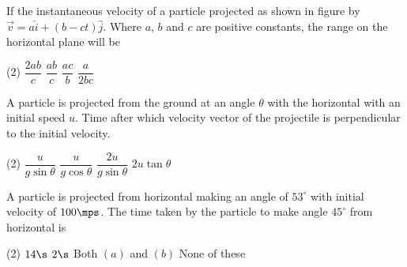 \item If the instantaneous velocity of a particle projected as shown in figure by $\Vec{v}=a\hat{i}+(b-ct)\hat{j}$. Where $a$, $b$ and $c$ are positive constants, the range on the horizontal plane will be
\begin{center}
\end{center}
\begin{tasks}(2)
    \task $\dfrac{2ab}{c}$\ans
    \task $\dfrac{ab}{c}$
    \task $\dfrac{ac}{b}$
    \task $\dfrac{a}{2bc}$
\end{tasks}

\item A particle is projected from the ground at an angle $\theta$ with the horizontal with an initial speed $u$. Time after which velocity vector of the projectile is perpendicular to the initial velocity.
\begin{center}
\end{center}
\begin{tasks}(2)
    \task $\dfrac{u}{g\sin\theta}$\ans
    \task $\dfrac{u}{g\cos\theta}$
    \task $\dfrac{2u}{g\sin\theta}$
    \task $2u\tan\theta$
\end{tasks}

\item A particle is projected from horizontal making an angle of $53^\circ$ with initial velocity of $100\mps$. The time taken by the particle to make angle $45^\circ$ from horizontal is
\begin{tasks}(2)
    \task $14\s$
    \task $2\s$
    \task Both $(a)$ and $(b)$\ans
    \task None of these
\end{tasks}

